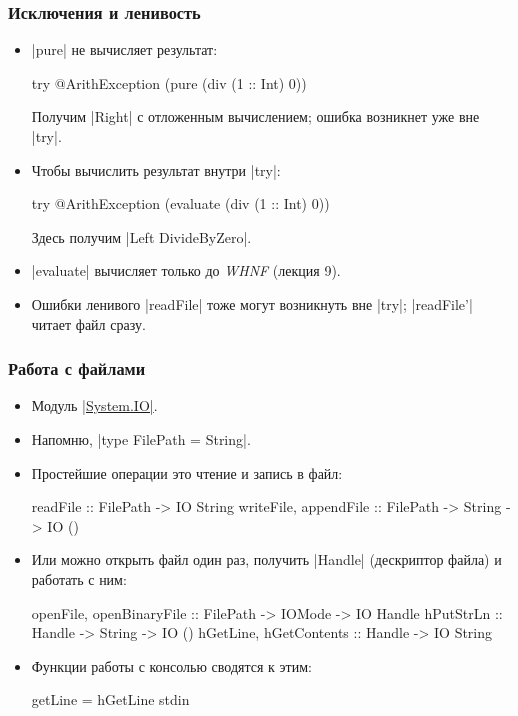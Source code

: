 \documentclass[11pt]{beamer}
\begin{document}
\begin{frame}[fragile]
  \frametitle{Исключения и ленивость}
  \begin{itemize}
    \item \haskinline|pure| не вычисляет результат:
          \begin{haskellsmall}
            try @ArithException (pure (div (1 :: Int) 0))
          \end{haskellsmall}
          Получим \haskinline|Right| с отложенным вычислением; ошибка возникнет уже вне \haskinline|try|.
          \pause
    \item Чтобы вычислить результат внутри \haskinline|try|:
          \begin{haskellsmall}
            try @ArithException (evaluate (div (1 :: Int) 0))
          \end{haskellsmall}
          Здесь получим \haskinline|Left DivideByZero|.
    \item \haskinline|evaluate| вычисляет только до \emph{WHNF} (лекция 9).
    \item Ошибки ленивого \haskinline|readFile| тоже могут возникнуть вне \haskinline|try|; \haskinline|readFile'| читает файл сразу.
  \end{itemize}
\end{frame}

\begin{frame}[fragile]
  \frametitle{Работа с файлами}
  \begin{itemize}
    \item Модуль \href{https://hackage.haskell.org/package/base/docs/System-IO.html}{\haskinline|System.IO|}.
    \item Напомню, \haskinline|type FilePath = String|.
    \item Простейшие операции это чтение и запись в файл:
          \begin{haskell}
            readFile :: FilePath -> IO String
            writeFile, appendFile :: 
              FilePath -> String -> IO ()
          \end{haskell}
    \item
          Или можно открыть файл один раз, получить \haskinline|Handle| (дескриптор файла) и работать с ним:
          \begin{haskell}
            openFile, openBinaryFile :: 
              FilePath -> IOMode -> IO Handle 
            hPutStrLn :: Handle -> String -> IO ()
            hGetLine, hGetContents :: Handle -> IO String
          \end{haskell}
          \pause
    \item
          Функции работы с консолью сводятся к этим:
          \begin{haskell}
            getLine = hGetLine stdin
          \end{haskell}
  \end{itemize}
\end{frame}
\end{document}
